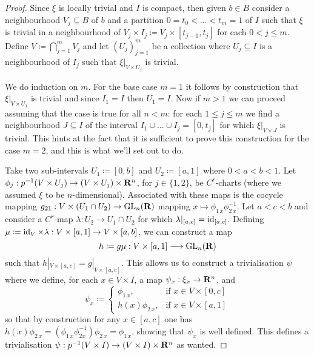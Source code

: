 \documentclass[../../../deep-dive]{subfile}
\begin{document}
\begin{proof}
    Since \(\xi\) is locally trivial and \(I\) is compact, then given \(b \in B\)
    consider a neighbourhood \(V_j \subseteq B\) of \(b\) and a partition
    \(0 = t_0 < \dots < t_m = 1\) of \(I\) such that \(\xi\) is trivial in a
    neighbourhood of \(V_j \times I_j \coloneq V_j \times [t_{j-1}, t_j]\) for each
    \(0 < j \leq m\). Define \(V \coloneq \bigcap_{j=1}^m V_j\) and let
    \((U_j)_{j=1}^m\) be a collection where \(U_j \subseteq I\) is a neighbourhood
    of \(I_j\) such that \(\xi|_{V \times U_j}\) is trivial.

    We do induction on \(m\). For the base case \(m = 1\) it follows by construction
    that \(\xi|_{V \times U_1}\) is trivial and since \(I_1 = I\) then \(U_1 =
    I\). Now if \(m > 1\) we can proceed assuming that the case is true for all
    \(n < m\): for each \(1 \leq j \leq m\) we find a neighbourhood
    \(J \subseteq I\) of the interval \(I_1 \cup \dots \cup I_j = [0, t_j]\) for
    which \(\xi|_{V \times J}\) is trivial. This hints at the fact that it is
    sufficient to prove this construction for the case \(m = 2\), and this is what
    we'll set out to do.

    Take two sub-intervals \(U_1 \coloneq [0, b]\) and \(U_2 \coloneq [a, 1]\) where
    \(0 < a < b < 1\). Let
    \(\phi_j: p^{-1}(V \times U_j) \to (V \times U_j) \times \mathbf{R}^n\), for
    \(j \in \{1, 2\}\), be \(C^r\)-charts (where we assumed \(\xi\) to be
    \(n\)-dimensional). Associated with these maps is the cocycle mapping
    \(g_{2 1}: V \times (U_1 \cap U_2) \to \operatorname{GL}_n(\mathbf{R})\) mapping
    \(x \mapsto \phi_{1\, x} \phi_{2\, x}^{-1}\). Let \(a < c < b\) and consider a
    \(C^r\)-map \(\lambda: U_2 \to U_1 \cap U_2\) for which
    \(\lambda|_{[a, c]} = \operatorname{id}_{[a, c]}\). Defining \(\mu \coloneq \operatorname{id}_V \times
    \lambda: V \times [a, 1] \to V \times [a, b]\), we can construct a map
    \[
        h \coloneq g \mu: V \times [a, 1] \longrightarrow \operatorname{GL}_n(\mathbf{R})
    \]
    such that \(h|_{V \times [a, c]} = g|_{V \times [a, c]}\). This allows us to
    construct a trivialisation \(\psi\) where we define, for each \(x \in V \times
    I\), a map \(\psi_x: \xi_x \to \mathbf{R}^n\), and
    \[
        \psi_x \coloneq
        \begin{cases}
            \phi_{1\, x},      & \text{if } x \in V \times [0, c] \\
            h(x) \phi_{2\, x}, & \text{if } x \in V \times [a, 1]
        \end{cases}
    \]
    so that by construction for any \(x \in [a, c]\) one has
    \(h(x) \phi_{2\, x} = (\phi_{1\, x} \phi_{2 x}^{-1}) \phi_{2\, x} = \phi_{1\,
        x}\), showing that \(\psi_x\) is well defined. This defines a trivialisation
    \(\psi: p^{-1}(V \times I) \to (V \times I) \times \mathbf{R}^n\) as wanted.
\end{proof}
\end{document}
